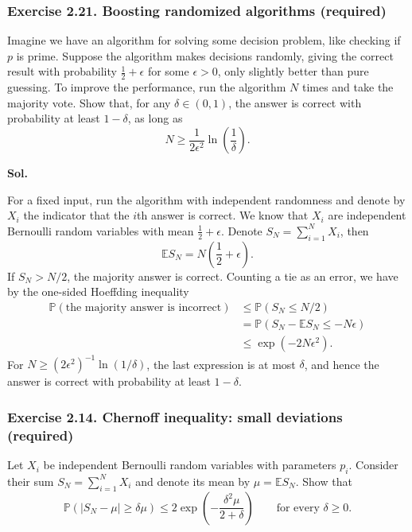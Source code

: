 \documentclass[lang=en,11pt,a4paper,citestyle=authoryear,nobib=true]{elegantpaper}
\newcommand{\E}{\mathbb{E}}
\renewcommand{\P}{\mathbb{P}}
\begin{document}
\subsubsection*{Exercise 2.21. Boosting randomized algorithms (required)}
Imagine we have an algorithm for solving some decision problem, like
checking if $p$ is prime. Suppose the algorithm makes decisions randomly,
giving the correct result with probability $\frac12+\epsilon$ for some
$\epsilon>0$, only slightly better than pure guessing. To improve the
performance, run the algorithm $N$ times and take the majority vote.
Show that, for any $\delta\in(0,1)$, the answer is correct with probability
at least $1-\delta$, as long as
\[
N\ge\frac{1}{2\epsilon^2}\ln\left(\frac1\delta\right).
\]

\par\vspace{0.5em}\noindent\textbf{Sol.}\par
For a fixed input, run the algorithm with independent randomness and
denote by $X_i$ the indicator that the $i$th answer is correct. We know
that $X_i$ are independent Bernoulli random variables with mean
$\frac12+\epsilon$. Denote $S_N=\sum_{i=1}^N X_i$, then
\[
\E S_N=N\left(\frac12+\epsilon\right).
\]
If $S_N>N/2$, the majority answer is correct. Counting a tie as an error,
we have by the one-sided Hoeffding inequality
\[
\begin{aligned}
\P(\text{the majority answer is incorrect})
&\le\P(S_N\le N/2)\\
&=\P(S_N-\E S_N\le-N\epsilon)\\
&\le\exp(-2N\epsilon^2).
\end{aligned}
\]
For $N\ge(2\epsilon^2)^{-1}\ln(1/\delta)$, the last expression is at most
$\delta$, and hence the answer is correct with probability at least
$1-\delta$.
\vspace{1em}

\subsubsection*{Exercise 2.14. Chernoff inequality: small deviations (required)}
Let $X_i$ be independent Bernoulli random variables with parameters $p_i$.
Consider their sum $S_N=\sum_{i=1}^N X_i$ and denote its mean by
$\mu=\E S_N$. Show that
\[
\P(|S_N-\mu|\ge\delta\mu)
\le2\exp\left(-\frac{\delta^2\mu}{2+\delta}\right)
\qquad\text{for every }\delta\ge0.
\]
\end{document}
